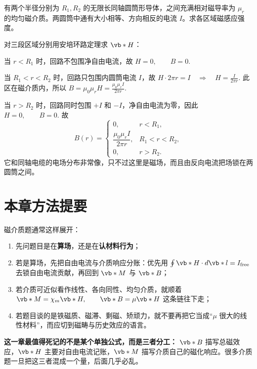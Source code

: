 \documentclass[lang=cn,11pt]{elegantbook}
\begin{document}
\begin{exercise}[两同轴反向电流圆筒间的磁场]
有两个半径分别为 \(R_1,R_2\) 的无限长同轴圆筒形导体，之间充满相对磁导率为 \(\mu_r\) 的均匀磁介质。两圆筒中通有大小相等、方向相反的电流 \(I\)。求各区域磁感应强度。
\end{exercise}

\begin{solution}
对三段区域分别用安培环路定理求 \(\vb*{H}\)：

当 \(r<R_1\) 时，回路不包围净自由电流，故
 \(H=0,\qquad B=0.\) 

当 \(R_1<r<R_2\) 时，回路只包围内圆筒电流 \(I\)，故
 \(H\cdot 2\pi r=I \quad\Longrightarrow\quad H=\frac{I}{2\pi r}.\) 
此区在磁介质内，所以
 \(B=\mu_0\mu_r H =\frac{\mu_0\mu_r I}{2\pi r}.\) 

当 \(r>R_2\) 时，回路同时包围 \(+I\) 和 \(-I\)，净自由电流为零，因此
 \(H=0,\qquad B=0.\) 
故
\[
\boxed{
B(r)=
\begin{cases}
0, & r<R_1,\\[4pt]
\dfrac{\mu_0\mu_r I}{2\pi r}, & R_1<r<R_2,\\[6pt]
0, & r>R_2.
\end{cases}}
\]
它和同轴电缆的电场分布非常像，只不过这里是磁场，而且由反向电流把场锁在两圆筒之间。
\end{solution}

\section{本章方法提要}

磁介质题通常这样展开：
\begin{enumerate}
 \item 先问题目是在\textbf{算场}，还是在\textbf{认材料行为}；
 \item 若是算场，先把自由电流与介质响应分账：优先用
 \(\oint \vb*{H}\cdot d\vb*{l}=I_{\mathrm{free}}\) 
 去锁自由电流贡献，再回到 \(\vb*{M}\) 与 \(\vb*{B}\)；
 \item 若介质可近似看作线性、各向同性、均匀介质，就顺着
 \(\vb*{M}=\chi_m\vb*{H}, \qquad \vb*{B}=\mu\vb*{H}\) 
 这条链往下走；
 \item 若题目谈的是铁磁质、磁滞、剩磁、矫顽力，就不要再把它当成“\(\mu\) 很大的线性材料”，而应切到磁畴与历史效应的语言。
\end{enumerate}

\begin{note}
\textbf{这一章最值得死记的不是某个单独公式，而是三者分工：} \(\vb*{B}\) 描写总磁效应，\(\vb*{H}\) 主要对自由电流记账，\(\vb*{M}\) 描写介质自己的磁化响应。很多介质题一旦把这三者混成一个量，后面几乎必乱。
\end{note}
\end{document}
